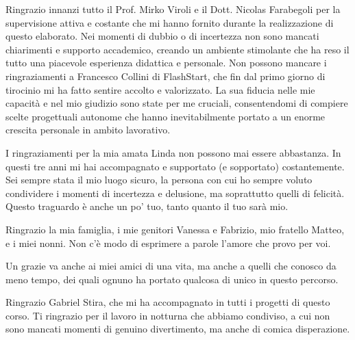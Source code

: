 \documentclass[12pt,a4paper,openright,twoside]{book}
\begin{document}
\backmatter





\begin{acknowledgements}

Ringrazio innanzi tutto il Prof. Mirko Viroli e il Dott. Nicolas Farabegoli per la supervisione attiva e costante che mi hanno fornito durante la realizzazione di questo elaborato. Nei momenti di dubbio o di incertezza non sono mancati chiarimenti e supporto accademico, creando un ambiente stimolante che ha reso il tutto una piacevole esperienza didattica e personale.
Non possono mancare i ringraziamenti a Francesco Collini di FlashStart, che fin dal primo giorno di tirocinio mi ha fatto sentire accolto e valorizzato. La sua fiducia nelle mie capacità e nel mio giudizio sono state per me cruciali, consentendomi di compiere scelte progettuali autonome che hanno inevitabilmente portato a un enorme crescita personale in ambito lavorativo.

I ringraziamenti per la mia amata Linda non possono mai essere abbastanza. In questi tre anni mi hai accompagnato e supportato (e sopportato) costantemente. Sei sempre stata il mio luogo sicuro, la persona con cui ho sempre voluto condividere i momenti di incertezza e delusione, ma soprattutto quelli di felicità. Questo traguardo è anche un po' tuo, tanto quanto il tuo sarà mio.

Ringrazio la mia famiglia, i mie genitori Vanessa e Fabrizio, mio fratello Matteo, e i miei nonni. Non c'è modo di esprimere a parole l'amore che provo per voi.

Un grazie va anche ai miei amici di una vita, ma anche a quelli che conosco da meno tempo, dei quali ognuno ha portato qualcosa di unico in questo percorso.

Ringrazio Gabriel Stira, che mi ha accompagnato in tutti i progetti di questo corso. Ti ringrazio per il lavoro in notturna che abbiamo condiviso, a cui non sono mancati momenti di genuino divertimento, ma anche di comica disperazione. 

\end{acknowledgements}
\end{document}
